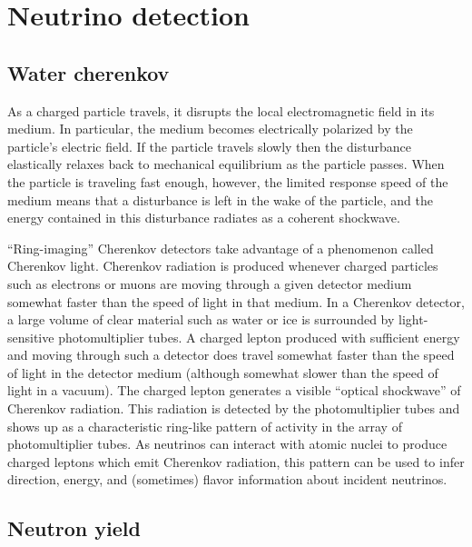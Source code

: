 \section{Neutrino detection}
\label{sec:1.3}
\subsection{Water cherenkov}
\label{sec:1.3.1}
As a charged particle travels, it disrupts the local electromagnetic field in its medium.
In particular, the medium becomes electrically polarized by the particle's electric field.
If the particle travels slowly then the disturbance elastically relaxes back to %
mechanical equilibrium as the particle passes.
When the particle is traveling fast enough, however, the limited response speed of %
the medium means that a disturbance is left in the wake of the particle, %
and the energy contained in this disturbance radiates as a coherent shockwave.

``Ring-imaging'' Cherenkov detectors take advantage of a phenomenon called Cherenkov light.
Cherenkov radiation is produced whenever charged particles such as electrons or muons %
are moving through a given detector medium somewhat faster than the speed of light in that medium.
In a Cherenkov detector, a large volume of clear material such as water or ice %
is surrounded by light-sensitive photomultiplier tubes.
A charged lepton produced with sufficient energy and moving through %
such a detector does travel somewhat faster than the speed of light in the detector medium %
(although somewhat slower than the speed of light in a vacuum).
The charged lepton generates a visible ``optical shockwave'' of Cherenkov radiation.
This radiation is detected by the photomultiplier tubes and shows up as a characteristic %
ring-like pattern of activity in the array of photomultiplier tubes.
As neutrinos can interact with atomic nuclei to produce charged leptons which emit %
Cherenkov radiation, this pattern can be used to infer direction, energy, %
and (sometimes) flavor information about incident neutrinos.



\subsection{Neutron yield}
\label{sec:1.3.2}

